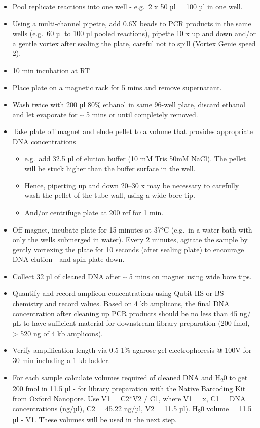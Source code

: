 \documentclass[
]{book}
\providecommand{\tightlist}{%
  \setlength{\itemsep}{0pt}\setlength{\parskip}{0pt}}
\begin{document}
\begin{itemize}
\tightlist
\item
  Pool replicate reactions into one well - e.g.~2 x 50 µl = 100 µl in one well.
\item
  Using a multi-channel pipette, add 0.6X beads to PCR products in the same wells (e.g.~60 µl to 100 µl pooled reactions), pipette 10 x up and down and/or a gentle vortex after sealing the plate, careful not to spill (Vortex Genie speed 2).
\item
  10 min incubation at RT
\item
  Place plate on a magnetic rack for 5 mins and remove supernatant.
\item
  Wash twice with 200 µl 80\% ethanol in same 96-well plate, discard ethanol and let evaporate for \textasciitilde{} 5 mins or until completely removed.
\item
  Take plate off magnet and elude pellet to a volume that provides appropriate DNA concentrations

  \begin{itemize}
  \tightlist
  \item
    e.g.~add 32.5 µl of elution buffer (10 mM Tris 50mM NaCl). The pellet will be stuck higher than the buffer surface in the well.
  \item
    Hence, pipetting up and down 20--30 x may be necessary to carefully wash the pellet of the tube wall, using a wide bore tip.
  \item
    And/or centrifuge plate at 200 rcf for 1 min.
  \end{itemize}
\item
  Off-magnet, incubate plate for 15 minutes at 37°C (e.g.~in a water bath with only the wells submerged in water). Every 2 minutes, agitate the sample by gently vortexing the plate for 10 seconds (after sealing plate) to encourage DNA elution - and spin plate down.
\item
  Collect 32 µl of cleaned DNA after \textasciitilde{} 5 mins on magnet using wide bore tips.
\item
  Quantify and record amplicon concentrations using Qubit HS or BS chemistry and record values. Based on 4 kb amplicons, the final DNA concentration after cleaning up PCR products should be no less than 45 ng/µL to have sufficient material for downstream library preparation (200 fmol, \textgreater{} 520 ng of 4 kb amplicons).
\item
  Verify amplification length via 0.5-1\% agarose gel electrophoresis @ 100V for 30 min including a 1 kb ladder.
\item
  For each sample calculate volumes required of cleaned DNA and H\textsubscript{2}0 to get 200 fmol in 11.5 µl - for library preparation with the Native Barcoding Kit from Oxford Nanopore. Use V1 = C2*V2 / C1, where V1 = x, C1 = DNA concentrations (ng/µl), C2 = 45.22 ng/µl, V2 = 11.5 µl). H\textsubscript{2}0 volume = 11.5 µl - V1. These volumes will be used in the next step.
\end{itemize}
\end{document}
